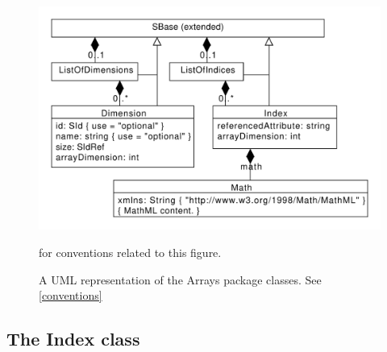 \begin{figure}[h]
  \centering
  \includegraphics[width=1.0\textwidth]{images/arraysUML.pdf}\\
  \caption{A UML representation of the Arrays package classes. See \ref{conventions}} for conventions related to this figure. \label{fig:fbc_uml}
\end{figure}

\subsection{The Index class}




